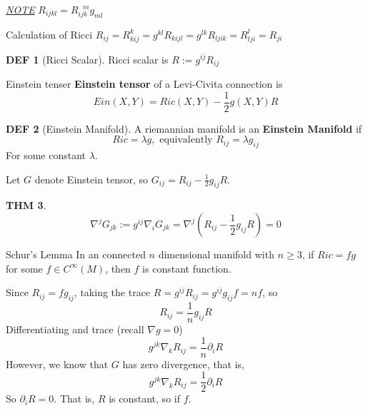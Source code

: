 \documentclass[twocolumn]{article}
\renewcommand{\emph}[1]{{\color{blue!70!black}\sffamily\bfseries #1}}
\newcommand{\n}{\nabla}
\newcommand{\C}{C^{\infty}}
\newcommand{\p}{\partial}
\newcommand{\N}{\textit{\underline{NOTE} }}
\theoremstyle{definition}
\newtheorem{thm}{THM}
\newtheorem{defi}[thm]{DEF}
\begin{document}
\N $R_{ijkl} = R_{ijk}^{\ \ \ m} g_{ml}$

\begin{eg}{Calculation of Ricci}{}
	$R_{ij} = R_{kij}^k = g^{kl}R_{kijl} = g^{lk}R_{ljik} = R_{lji}^l = R_{ji} $ 
\end{eg}

\begin{defi}[Ricci Scalar]
	Ricci scalar is $R := g^{ij}R_{ij}$
\end{defi}

\begin{fdefi}{Einstein tenser}{}
	\emph{Einstein tensor} of a Levi-Civita connection is 
	$$
	Ein(X, Y) = Ric(X, Y) - \frac{1}{2}g(X, Y)R
	$$
\end{fdefi}

\begin{defi}[Einstein Manifold]
	A riemannian manifold is an \emph{Einstein Manifold} if 
	$$
	Ric = \lambda g, \text{ equivalently } R_{ij} = \lambda g_{ij}
	$$
	For some constant $\lambda$.
\end{defi}

Let $G$ denote Einstein tensor, so $G_{ij} = R_{ij} - \frac{1}{2}g_{ij}R$.

\begin{thm}
	$$
\n ^{j} G_{jk} := g^{ij}\n_{i} G_{jk} = \n^j(R_{ij} - \frac{1}{2}g_{ij}R)= 0
	$$
\end{thm}

\begin{eg}{Schur's Lemma}{}
	In an connected $n$ dimensional manifold with $n \geq 3$, if $Ric = fg$ for some $f \in \C(M)$, then $f$ is constant function.

	\tcblower
	Since $R_{ij} = fg_{ij}$, taking the trace $R = g^{ij}R_{ij} = g^{ij}g_{ij}f = nf$, so 
	$$R_{ij} = \frac{1}{n} g_{ij} R$$
	Differentiating and trace (recall $ \n g = 0$)
	$$
		g^{jk} \n_{k}R_{ij} = \frac{1}{n} \p_i R 
	$$
	However, we know that $G$ has zero divergence, that is, 
	$$
		g^{jk} \n_{k}R_{ij} = \frac{1}{2} \p_i R 
	$$
	So $\p_i R = 0$. That is, $R$ is constant, so if $f$.
\end{eg}
\end{document}

